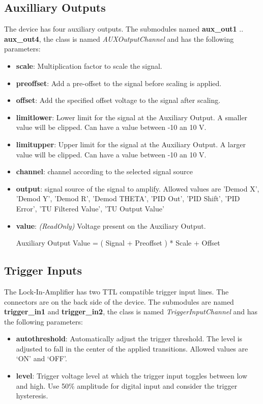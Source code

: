 \documentclass[11pt]{article} %
\begin{document}
\subsection{Auxilliary Outputs}
The device has four auxiliary outputs. The submodules named {\bf aux\_out1} .. {\bf aux\_out4}, the class is named {\it AUXOutputChannel} and has the following parameters:
\begin{itemize}
\item {\bf scale}: Multiplication factor to scale the signal.
\item {\bf preoffset}: Add a pre-offset to the signal before scaling is applied.
\item {\bf offset}: Add the specified offset voltage to the signal after scaling.
\item {\bf limitlower}: Lower limit for the signal at the Auxiliary Output. A smaller value will be clipped. Can have a value between -10 an 10 V.
\item {\bf limitupper}: Upper limit for the signal at the Auxiliary Output. A larger value will be clipped. Can have a value between -10 an 10 V.
\item {\bf channel}: channel according to the selected signal source
\item {\bf output}: signal source of the signal to amplify. Allowed values are 'Demod X', 'Demod Y', 'Demod R', 'Demod THETA', 'PID Out', 'PID Shift', 'PID Error', 'TU Filtered Value', 'TU Output Value'
\item {\bf value}: {\it (ReadOnly)} Voltage present on the Auxiliary Output. \\
\centerline{Auxiliary Output Value = ( Signal + Preoffset ) * Scale + Offset}
\end{itemize}


\subsection{Trigger Inputs}
The Lock-In-Amplifier has two TTL compatible trigger input lines. The connectors are on the back side of the device. The submodules are named {\bf trigger\_in1} and {\bf trigger\_in2}, the class is named {\it TriggerInputChannel} and has the following parameters:
\begin{itemize}
\item {\bf autothreshold}: Automatically adjust the trigger threshold. The level is adjusted to fall in the center of the applied transitions. Allowed values are `ON' and `OFF'.
\item {\bf level}: Trigger voltage level at which the trigger input toggles between low and high. Use 50\% amplitude for digital input and consider the trigger hysteresis.
\end{itemize}
\end{document}
